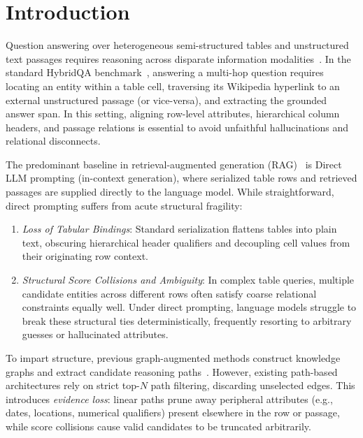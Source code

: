 \documentclass[runningheads]{llncs}
\begin{document}
\section{Introduction}
Question answering over heterogeneous semi-structured tables and unstructured text passages requires reasoning across disparate information modalities~\cite{zhou2026tableqasurvey}. In the standard HybridQA benchmark~\cite{hybridqa}, answering a multi-hop question requires locating an entity within a table cell, traversing its Wikipedia hyperlink to an external unstructured passage (or vice-versa), and extracting the grounded answer span. In this setting, aligning row-level attributes, hierarchical column headers, and passage relations is essential to avoid unfaithful hallucinations and relational disconnects.

The predominant baseline in retrieval-augmented generation (RAG)~\cite{lewis2020rag,guu2020realm,gao2023ragsurvey} is Direct LLM prompting (in-context generation), where serialized table rows and retrieved passages are supplied directly to the language model. While straightforward, direct prompting suffers from acute structural fragility:
\begin{enumerate}
    \item \emph{Loss of Tabular Bindings}: Standard serialization flattens tables into plain text, obscuring hierarchical header qualifiers and decoupling cell values from their originating row context.
    \item \emph{Structural Score Collisions and Ambiguity}: In complex table queries, multiple candidate entities across different rows often satisfy coarse relational constraints equally well. Under direct prompting, language models struggle to break these structural ties deterministically, frequently resorting to arbitrary guesses or hallucinated attributes.
\end{enumerate}

To impart structure, previous graph-augmented methods construct knowledge graphs and extract candidate reasoning paths~\cite{yasunaga2021qagnn,pan2024unifying,peng2024graphragsurvey}. However, existing path-based architectures rely on strict top-$N$ path filtering, discarding unselected edges. This introduces \emph{evidence loss}: linear paths prune away peripheral attributes (e.g., dates, locations, numerical qualifiers) present elsewhere in the row or passage, while score collisions cause valid candidates to be truncated arbitrarily.
\end{document}
